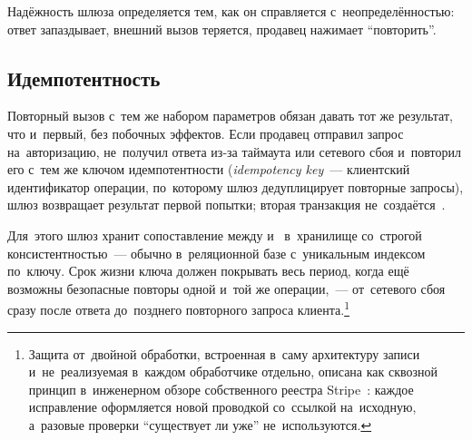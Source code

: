 Надёжность шлюза определяется тем, как он справляется с~неопределённостью:
ответ запаздывает, внешний вызов теряется, продавец нажимает
\enquote{повторить}.

\subsection*{Идемпотентность}

Повторный вызов с~тем же набором параметров обязан давать тот же результат, что
и~первый, без побочных эффектов. Если продавец отправил запрос на~авторизацию,
не~получил ответа из-за таймаута или сетевого сбоя и~повторил его с~тем же
ключом идемпотентности (\textit{idempotency key}~--- клиентский идентификатор операции,
по~которому шлюз дедуплицирует повторные запросы), шлюз возвращает результат
первой попытки; вторая транзакция
не~создаётся~\cite{stripe-idempotency,adyen-api-idempotency}.

Для~этого шлюз хранит сопоставление между 
и~ в~хранилище со~строгой консистентностью~--- обычно
в~реляционной базе с~уникальным индексом по~ключу. Срок жизни ключа должен
покрывать весь период, когда ещё возможны безопасные повторы одной и~той же
операции,~--- от~сетевого сбоя сразу после ответа до~позднего повторного
запроса клиента.\footnote{Защита от~двойной обработки, встроенная в~саму
  архитектуру записи и~не~реализуемая в~каждом обработчике отдельно, описана
  как сквозной принцип в~инженерном обзоре собственного реестра
  Stripe~\cite{stripe-ledger-blog}: каждое исправление оформляется новой
  проводкой со~ссылкой на~исходную, а~разовые проверки \enquote{существует ли
уже} не~используются.}


